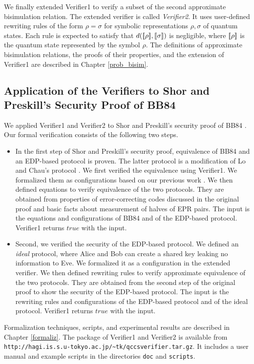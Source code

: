        We finally extended Verifier1
       to verify a subset of the second approximate bisimulation
       relation. The extended verifier is called {\it Verifier2}.
       It uses
       user-defined rewriting rules of the form $\rho = \sigma$
       for symbolic representations $\rho, \sigma$ of quantum states.
       Each rule is expected to satisfy that
       $d([\![\rho]\!], [\![\sigma]\!])$ is negligible, where
       $[\![\rho]\!]$ is the quantum state represented by the symbol 
       $\rho$. The definitions of approximate bisimulation
       relations, the proofs of their properties, and
       the extension of Verifier1 are described in
       Chapter \ref{prob_bisim}.
\subsection{Application of the Verifiers to Shor and Preskill's 
Security Proof of BB84}
We applied Verifier1 and Verifier2 to Shor and Preskill's
security proof of BB84 \cite{ShorPreskill2000}.
Our formal verification consists of the following two steps.
 \begin{itemize}
  \item In the first step of Shor and Preskill's security proof,
	equivalence of BB84 and an EDP-based protocol is proven.
	The latter protocol is a modification of Lo and Chau's
	protocol \cite{LoChau1999}.
	We first verified the equivalence using Verifier1.
	We formalized them
	as configurations
	based on our previous work
	\cite{Kubota2012}.
	We then defined equations to verify
	equivalence of the two protocols.
	They are obtained from properties of
	error-correcting codes
	discussed in the original proof \cite{ShorPreskill2000}
	and basic facts about measurement of halves of EPR pairs.
	The input is the equations and configurations of
	BB84 and of the EDP-based protocol.
	Verifier1 returns $\mathit{true}$ with the input.
  \item Second, we verified the security of the
	EDP-based protocol.
	We defined an {\it ideal} protocol, where Alice and Bob
	can create a shared key leaking no information to Eve.
	We formalized it as a configuration in the extended
	verifier. 
	We then defined rewriting rules to verify
	approximate equivalence of the
	two protocols. They
	are obtained from the second step of the 
	original proof \cite{ShorPreskill2000}
	to show the security of the EDP-based protocol.
	The input is the rewriting rules and configurations of
	the EDP-based protocol and of the ideal protocol.
	Verifier1 returns $\mathit{true}$ with the input.
 \end{itemize}
Formalization techniques, scripts, and experimental results
are described in Chapter \ref{formaliz}.
The package of Verifier1 and Verifier2 is available from\\
\texttt{http://hagi.is.s.u-tokyo.ac.jp/\~{}tk/qccs}\texttt{verifier.tar.gz}.
It includes a user manual and example scripts in the directories
\texttt{doc} and \texttt{scripts}.

